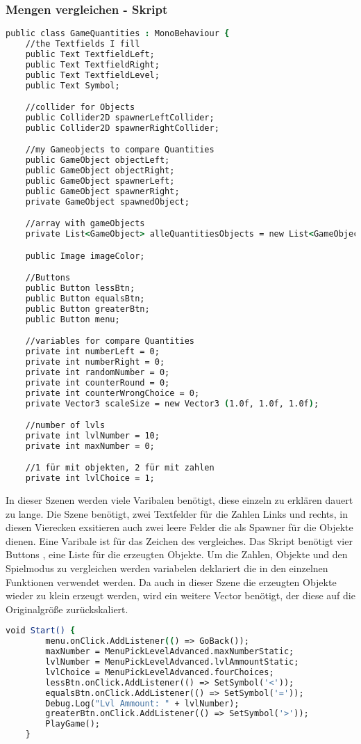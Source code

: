 \subsubsection{Mengen vergleichen - Skript}
\begin{lstlisting}[language=csh, caption={GameQuantities.cs Variablen Deklaration}]
public class GameQuantities : MonoBehaviour {
	//the Textfields I fill
	public Text TextfieldLeft;
	public Text TextfieldRight;
	public Text TextfieldLevel;
	public Text Symbol;

	//collider for Objects
	public Collider2D spawnerLeftCollider;
	public Collider2D spawnerRightCollider;

	//my Gameobjects to compare Quantities
	public GameObject objectLeft;
	public GameObject objectRight;
	public GameObject spawnerLeft;
	public GameObject spawnerRight;
	private GameObject spawnedObject;

	//array with gameObjects
	private List<GameObject> alleQuantitiesObjects = new List<GameObject>(40);

	public Image imageColor;

	//Buttons
	public Button lessBtn;
	public Button equalsBtn;
	public Button greaterBtn;
	public Button menu;

	//variables for compare Quantities
	private int numberLeft = 0;
	private int numberRight = 0;
	private int randomNumber = 0;
	private int counterRound = 0;
	private int counterWrongChoice = 0;
	private Vector3 scaleSize = new Vector3 (1.0f, 1.0f, 1.0f);

	//number of lvls
	private int lvlNumber = 10;
	private int maxNumber = 0;

	//1 für mit objekten, 2 für mit zahlen
	private int lvlChoice = 1;
\end{lstlisting}
In dieser Szenen werden viele Varibalen benötigt, diese einzeln zu erklären dauert zu lange. Die Szene benötigt, zwei Textfelder für die Zahlen Links und rechts, in diesen Vierecken exsitieren auch zwei leere Felder die als Spawner für die Objekte dienen. Eine Varibale ist für das Zeichen des vergleiches. Das Skript benötigt vier Buttons , eine Liste für die erzeugten Objekte. Um die Zahlen, Objekte und den Spielmodus zu vergleichen werden variabelen deklariert die in den einzelnen Funktionen verwendet werden. Da auch in dieser Szene die erzeugten Objekte wieder zu klein erzeugt werden, wird ein weitere Vector benötigt, der diese auf die Originalgröße zurückskaliert.\\
\begin{lstlisting}[language=csh, caption={GameQuantities.cs Start Funktion}]
	void Start() {
		menu.onClick.AddListener(() => GoBack());
		maxNumber = MenuPickLevelAdvanced.maxNumberStatic;
		lvlNumber = MenuPickLevelAdvanced.lvlAmmountStatic;
		lvlChoice = MenuPickLevelAdvanced.fourChoices;
		lessBtn.onClick.AddListener(() => SetSymbol('<'));
		equalsBtn.onClick.AddListener(() => SetSymbol('='));
		Debug.Log("Lvl Ammount: " + lvlNumber);
		greaterBtn.onClick.AddListener(() => SetSymbol('>'));
		PlayGame();
	}
\end{lstlisting}
